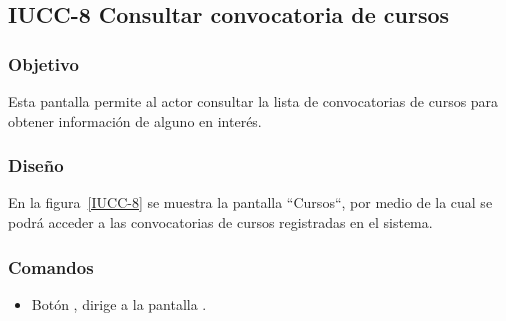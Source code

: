 \subsection{IUCC-8 Consultar convocatoria de cursos}
 
\subsubsection{Objetivo}

    Esta pantalla permite al actor  consultar la lista de convocatorias de cursos para obtener información de alguno en interés.
\subsubsection{Diseño}

    En la figura~\ref{IUCC-8} se muestra la pantalla ``Cursos“, por medio de la cual se podrá acceder a las convocatorias de cursos registradas en el sistema. \\


\subsubsection{Comandos}
\begin{itemize}
    \item Botón , dirige a la pantalla .
\end{itemize}
